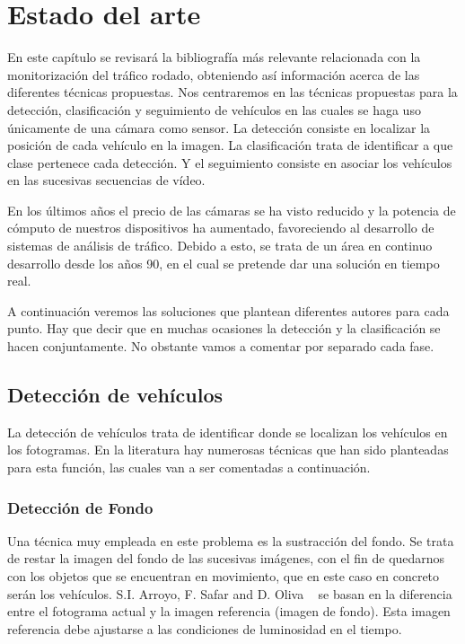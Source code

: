 \chapter{Estado del arte}\label{cap.estado}

En este capítulo se revisará la bibliografía más relevante relacionada con la monitorización del tráfico rodado, obteniendo así información acerca de las diferentes técnicas propuestas. Nos centraremos en las técnicas propuestas para la detección, clasificación y seguimiento de vehículos en las cuales se haga uso únicamente de una cámara como sensor. La detección consiste en localizar la posición de cada vehículo en la imagen. La clasificación trata de identificar a que clase pertenece cada detección. Y el seguimiento consiste en asociar los vehículos en las sucesivas secuencias de vídeo.

En los últimos años el precio de las cámaras se ha visto reducido y la potencia de cómputo de nuestros dispositivos ha aumentado, favoreciendo al desarrollo de sistemas de análisis de tráfico. Debido a esto, se trata de un área en continuo desarrollo desde los años 90, en el cual se pretende dar una solución en tiempo real. 

A continuación veremos las soluciones que plantean diferentes autores para cada punto. Hay que decir que en muchas ocasiones la detección y la clasificación se hacen conjuntamente. No obstante vamos a comentar por separado cada fase.

\section{Detección de vehículos} \label{ap.deteccion_vehiculos}

La detección de vehículos trata de identificar donde se localizan los vehículos en los fotogramas. En la literatura hay numerosas técnicas que han sido planteadas para esta función, las cuales van a ser comentadas a continuación. 

\subsection{Detección de Fondo}
Una técnica muy empleada en este problema es la sustracción del fondo. Se trata de restar la imagen del fondo de las sucesivas imágenes, con el fin de quedarnos con los objetos que se encuentran en movimiento, que en este caso en concreto serán los vehículos. S.I. Arroyo, F. Safar and D. Oliva ~\cite{probabilidad_infraccion} se basan en la diferencia entre el fotograma actual y la imagen referencia (imagen de fondo). Esta imagen referencia debe ajustarse a las condiciones de luminosidad en el tiempo.
 
